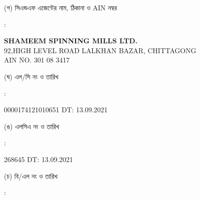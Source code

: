 \documentclass[12pt]{article}
\newcommand{\lcno}{0000174121010651}
\newcommand{\lcdt}{13.09.2021}
\newcommand{\lcano}{268645}
\newcommand{\lcadt}{13.09.2021}
\newcommand{\cnfn}{SHAMEEM SPINNING MILLS LTD.}
\newcommand{\cnfadd}{92,HIGH LEVEL ROAD
\newline
LALKHAN BAZAR, CHITTAGONG}
\newcommand{\cnfain}{301 08 3417}
\begin{document}
\begin{minipage}[t]{0.05\linewidth}
\hspace*{1em}
\end{minipage}
\begin{minipage}[t]{0.45\linewidth}
(গ) সিএন্ডএফ এজেন্টের নাম, ঠিকানা
ও AIN নম্বর
\end{minipage}
\begin{minipage}[t]{0.02\linewidth}
:
\end{minipage}
\begin{minipage}[t]{0.50\linewidth}
\textbf{{\cnfn}}
\\
{\cnfadd}
\\
AIN NO. {\cnfain}
\\
\end{minipage}
\begin{minipage}[t]{0.05\linewidth}
\hspace*{1em}
\end{minipage}
\begin{minipage}[t]{0.45\linewidth}
(ঘ) এল/সি নং ও তারিখ
\end{minipage}
\begin{minipage}[t]{0.02\linewidth}
:
\end{minipage}
\begin{minipage}[t]{0.50\linewidth}
{\lcno} \hspace{2em} DT: {\lcdt}
\\
\end{minipage}
\begin{minipage}[t]{0.05\linewidth}
\hspace*{1em}
\end{minipage}
\begin{minipage}[t]{0.45\linewidth}
(ঙ) এলসিএ নং ও তারিখ
\end{minipage}
\begin{minipage}[t]{0.02\linewidth}
:
\end{minipage}
\begin{minipage}[t]{0.50\linewidth}
{\lcano} \hspace{2em} DT: {\lcadt}
\\
\end{minipage}
\begin{minipage}[t]{0.05\linewidth}
\hspace*{1em}
\end{minipage}
\begin{minipage}[t]{0.45\linewidth}
(চ) বি/এল নং ও তারিখ
\end{minipage}
\begin{minipage}[t]{0.02\linewidth}
:
\end{minipage}
\end{document}
